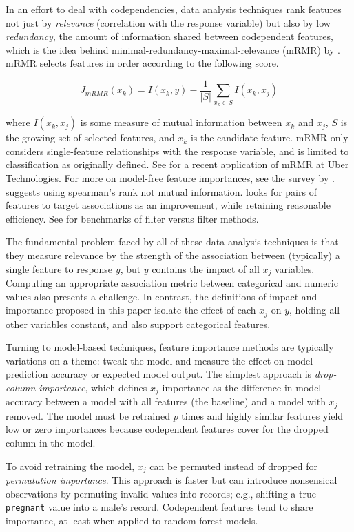 \documentclass[11pt]{article}
\begin{document}
In an effort to deal with codependencies, data analysis techniques rank features not just by {\em relevance} (correlation with the response variable) but also by low {\em redundancy}, the amount of information shared between codependent features, which is the idea behind minimal-redundancy-maximal-relevance (mRMR) by \citep{mRMR}. mRMR selects features in order according to the following score.

\[
J_{mRMR}(x_k) = I(x_k, y) - \frac{1}{|S|} \sum_{x_k \in S} I(x_k, x_j)
\]

\noindent where $I(x_k, x_j)$ is some measure of mutual information between $x_k$ and $x_j$, $S$ is the growing set of selected features, and $x_k$ is the candidate feature. mRMR only considers single-feature relationships with the response variable, and is limited to classification as originally defined. See \citep{ubermRMR} for a recent application of mRMR at Uber Technologies.  For more on model-free feature importances, see the survey by \citep{survey}.  \citet{tsanas} suggests using spearman's rank not mutual information. \citet{meyer-microarray} looks for pairs of features to target associations as an improvement, while retaining reasonable efficiency. See \citet{filter-benchmark} for benchmarks of filter versus filter methods.

The fundamental problem faced by all of these data analysis techniques is that they measure relevance by the strength of the association between (typically) a single feature to response $y$, but $y$ contains the impact of all $x_j$ variables. Computing an appropriate association metric between categorical and numeric values also presents a challenge.  In contrast, the definitions of impact and importance proposed in this paper isolate the effect of each $x_j$ on $y$, holding all other variables constant, and also support categorical features.
 
Turning to model-based techniques, feature importance methods are typically variations on a theme: tweak the model and measure the effect on model prediction accuracy or expected model output. The simplest approach is {\em drop-column importance}, which defines $x_j$ importance as the difference in model accuracy between a model with all features (the baseline) and a model with $x_j$ removed. The model must be retrained $p$ times and highly similar features yield low or zero importances because codependent features cover for the dropped column in the model.

To avoid retraining the model, $x_j$ can be permuted instead of dropped for {\em permutation importance}. This approach is faster but can introduce nonsensical observations by permuting invalid values into records; e.g., shifting a true {\tt\small pregnant} value into a male's record. Codependent features tend to share importance, at least when applied to random forest models.
\end{document}
